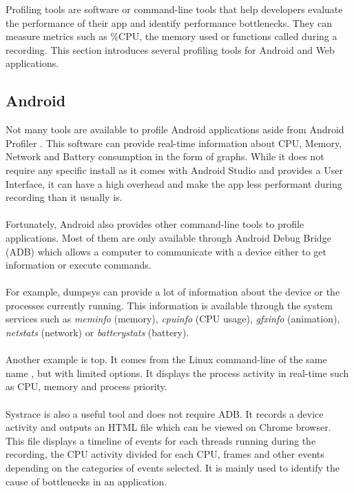\documentclass{kththesis}
\begin{document}
Profiling tools are software or command-line tools that help developers evaluate the performance of their app and identify performance bottlenecks. They can measure metrics such as \%CPU, the memory used or functions called during a recording.
This section introduces several profiling tools for Android and Web applications.



\subsection{Android}

Not many tools are available to profile Android applications aside from Android Profiler \cite{nanoscope}. This software can provide real-time information about CPU, Memory, Network and Battery consumption in the form of graphs. While it does not require any specific install as it comes with Android Studio and provides a User Interface, it can have a high overhead \cite{nanoscope} and make the app less performant during recording than it usually is. 

\paragraph{}
Fortunately, Android also provides other command-line tools to profile applications. Most of them are only available through Android Debug Bridge (ADB) \cite{adb} which allows a computer to communicate with a device either to get information or execute commands. 

\paragraph{}
For example, dumpsys \cite{dumpsys} can provide a lot of information about the device or the processes currently running. This information is available through the system services such as \textit{meminfo} (memory), \textit{cpuinfo} (CPU usage), \textit{gfxinfo} (animation), \textit{netstats} (network) or \textit{batterystats} (battery).

\paragraph{}
Another example is top. It comes from the Linux command-line of the same name \cite{top}, but with limited options. It displays the process activity in real-time such as CPU, memory and process priority.

\paragraph{}
Systrace \cite{systrace} is also a useful tool and does not require ADB. It records a device activity and outputs an HTML file which can be viewed on Chrome browser. This file displays a timeline of events for each threads running during the recording, the CPU activity divided for each CPU, frames and other events depending on the categories of events selected. It is mainly used to identify the cause of bottlenecks in an application.
\end{document}
